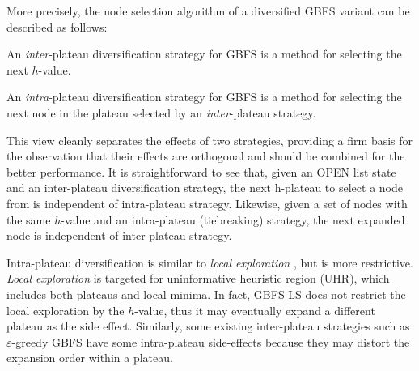 More precisely, the node selection algorithm of a diversified GBFS variant can be described as follows:
\begin{defi}
 An \emph{inter}-plateau diversification strategy for GBFS is a method for selecting the next $h$-value.
\end{defi}
\begin{defi}
 An \emph{intra}-plateau diversification strategy for GBFS is a method for selecting the next node in the plateau selected by an \emph{inter}-plateau strategy.
\end{defi}
This view cleanly separates the effects of two strategies, providing a firm basis for the observation that their effects are orthogonal and should be combined for the better performance.
It is straightforward to see that,
given an OPEN list state and an inter-plateau diversification strategy,
the next h-plateau to select a node from is independent of intra-plateau strategy.
Likewise, given a set of nodes with the same $h$-value and an intra-plateau (tiebreaking) strategy,
the next expanded node is independent of inter-plateau strategy.

Intra-plateau diversification is similar to \emph{local exploration} \cite{XieH14gbfsle,XieMH15}, but is more restrictive. \emph{Local exploration} is targeted for uninformative heuristic region (UHR), which includes both plateaus and local minima. In fact, GBFS-LS does not restrict the local exploration by the $h$-value, thus it may eventually expand a different plateau as the side effect.
Similarly, some existing inter-plateau strategies such as $\varepsilon$-greedy GBFS have some intra-plateau side-effects because they may distort the expansion order within a plateau.

% 

